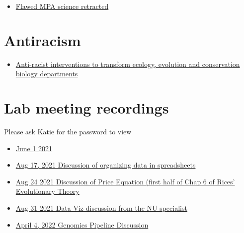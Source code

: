 \documentclass[
  letterpaper,
  DIV=11,
  numbers=noendperiod]{scrreprt}
\providecommand{\tightlist}{%
  \setlength{\itemsep}{0pt}\setlength{\parskip}{0pt}}\usepackage{longtable,booktabs,array}
\begin{document}

\begin{itemize}
\tightlist
\item
  \href{https://sustainablefisheries-uw.org/flawed-mpa-science-retracted/}{Flawed
  MPA science retracted}
\end{itemize}

\hypertarget{antiracism}{%
\section*{\texorpdfstring{\textbf{Antiracism}}{Antiracism}}\label{antiracism}}


\begin{itemize}
\tightlist
\item
  \href{https://www.nature.com/articles/s41559-021-01522-z}{Anti-racist
  interventions to transform ecology, evolution and conservation biology
  departments}
\end{itemize}

\hypertarget{lab-meeting-recordings}{%
\section*{\texorpdfstring{\textbf{Lab meeting
recordings}}{Lab meeting recordings}}\label{lab-meeting-recordings}}


Please ask Katie for the password to view

\begin{itemize}
\item
  \href{https://northeastern.zoom.us/rec/share/enHUqKE7sr-bq6gpBMBOsu2-vPz3YsobBGADU2wNAgl80B-O9ijm86bx9kxOiboj.nYjVibVUxw51caKb}{June
  1 2021}
\item
  \href{https://northeastern.zoom.us/rec/share/8Z6w6mkq-XTPgyDJU_zcLIp0M5U9tTh5rGo5bhlXdIfKR7vbV4bZsA2Nm3rxvbfv.d3krLgGquGjjO5CP}{Aug
  17, 2021 Discussion of organizing data in spreadsheets}
\item
  \href{https://northeastern.zoom.us/rec/share/9JS5ZfB-eySzp6VqK24pHh4bNft2uPhd8wLx3b7J2ycq1IQd4hxxt8bvcXs8WfJs.3dgAcoKa9fQZArZR}{Aug
  24 2021 Discussion of Price Equation (first half of Chap 6 of Rices'
  Evolutionary Theory}
\item
  \href{https://northeastern.zoom.us/rec/share/L4GY5DKi6XCi1nf8_RxkzyGyu6NAojZd4nsNsL1WpxiEfNp5qe_PHd5An9ngPANS.49r97rNHCjo5PNSH}{Aug
  31 2021 Data Viz discussion from the NU specialist}
\item
  \href{https://drive.google.com/file/d/1PGqdpTqKoK9ShX6yj6hNiqI7VVO43gOv/view?usp=sharing}{April
  4, 2022 Genomics Pipeline Discussion}
\end{itemize}
\end{document}
